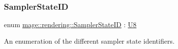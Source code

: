 \mbox{\label{namespacemage_1_1rendering_a6f80181126db61dbb8b528a6894eb658}} 
\subsubsection{\texorpdfstring{Sampler\+State\+ID}{SamplerStateID}}
{\footnotesize\ttfamily enum \mbox{\hyperlink{namespacemage_1_1rendering_a6f80181126db61dbb8b528a6894eb658}{mage\+::rendering\+::\+Sampler\+State\+ID}} \+: \mbox{\hyperlink{namespacemage_a30677c03d683c4c35630c25f6ff3fb7f}{U8}}\hspace{0.3cm}{\ttfamily [strong]}}

An enumeration of the different sampler state identifiers.

